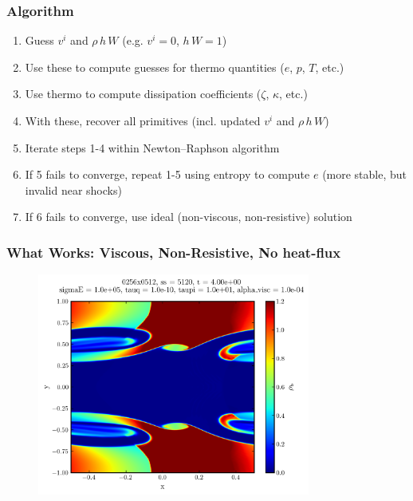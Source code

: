 \documentclass{beamer}
\begin{document}
\begin{frame}
\frametitle{Algorithm}

  \begin{enumerate}
    \item Guess $v^{i}$ and $\rho \, h \, W$ (e.g. $v^{i}=0$, $h \, W = 1$)
    \item Use these to compute guesses for thermo quantities ($e$, $p$, $T$, etc.)
    \item Use thermo to compute dissipation coefficients ($\zeta$, $\kappa$, etc.)
    \item With these, recover all primitives (incl. updated $v^{i}$ and $\rho \, h \, W$)
    \item Iterate steps 1-4 within Newton--Raphson algorithm
    \item If 5 fails to converge, repeat 1-5 using entropy to compute $e$
          (more stable, but invalid near shocks)
    \item If 6 fails to converge, use ideal (non-viscous, non-resistive) solution
  \end{enumerate}

\end{frame}

\begin{frame}
\frametitle{What Works: Viscous, Non-Resistive, No heat-flux}

  \begin{figure}[htb!]
    \centering
    \includegraphics[width=0.8\textwidth]{fig.KHI.png}
  \end{figure}

\end{frame}
\end{document}

